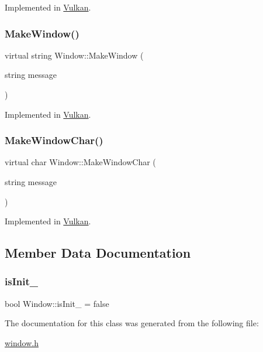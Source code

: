 Implemented in \mbox{\hyperlink{classVulkan_a308c68e03405bc740435a2af62cc7434}{Vulkan}}.

\mbox{\label{classWindow_a3a24c6368cb054a5ca3b32db2558319f}} 
\subsubsection{\texorpdfstring{Make\+Window()}{MakeWindow()}}
{\footnotesize\ttfamily virtual string Window\+::\+Make\+Window (\begin{DoxyParamCaption}\item[{string}]{message }\end{DoxyParamCaption})\hspace{0.3cm}{\ttfamily [pure virtual]}}



Implemented in \mbox{\hyperlink{classVulkan_a46c4ec53f8960a1fa3f3eb63d7755654}{Vulkan}}.

\mbox{\label{classWindow_ae770439748fb6b7dcdb3071860e687b3}} 
\subsubsection{\texorpdfstring{Make\+Window\+Char()}{MakeWindowChar()}}
{\footnotesize\ttfamily virtual char Window\+::\+Make\+Window\+Char (\begin{DoxyParamCaption}\item[{string}]{message }\end{DoxyParamCaption})\hspace{0.3cm}{\ttfamily [pure virtual]}}



Implemented in \mbox{\hyperlink{classVulkan_a70565678cd6771ac57706ff8586e256f}{Vulkan}}.



\subsection{Member Data Documentation}
\mbox{\label{classWindow_a06739ea2d178febdb7f0da5f775e5ba8}} 
\subsubsection{\texorpdfstring{is\+Init\+\_\+}{isInit\_}}
{\footnotesize\ttfamily bool Window\+::is\+Init\+\_\+ = false\hspace{0.3cm}{\ttfamily [protected]}}



The documentation for this class was generated from the following file\+:\begin{DoxyCompactItemize}
\item 
\mbox{\hyperlink{window_8h}{window.\+h}}\end{DoxyCompactItemize}

